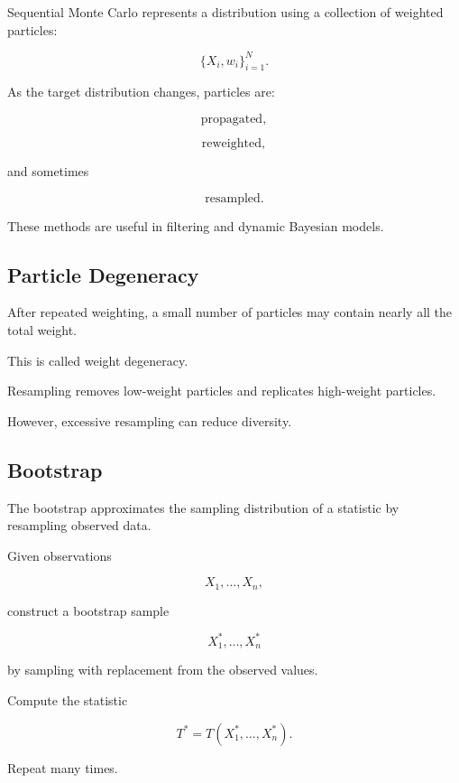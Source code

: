 Sequential Monte Carlo represents a distribution using a collection of
weighted particles:

\[
\boxed{
\{
X_i,w_i
\}_{i=1}^{N}.
}
\]

As the target distribution changes, particles are:

\[
\boxed{
\text{propagated},
}
\]

\[
\boxed{
\text{reweighted},
}
\]

and sometimes

\[
\boxed{
\text{resampled}.
}
\]

These methods are useful in filtering and dynamic Bayesian models.

\subsection{Particle Degeneracy}
\label{subsec:particle-degeneracy}

After repeated weighting, a small number of particles may contain nearly
all the total weight.

This is called weight degeneracy.

Resampling removes low-weight particles and replicates high-weight
particles.

However, excessive resampling can reduce diversity.

\subsection{Bootstrap}
\label{subsec:bootstrap-monte-carlo}

The bootstrap approximates the sampling distribution of a statistic by
resampling observed data.

Given observations

\[
X_1,\ldots,X_n,
\]

construct a bootstrap sample

\[
X_1^*,\ldots,X_n^*
\]

by sampling with replacement from the observed values.

Compute the statistic

\[
\boxed{
T^*
=
T(X_1^*,\ldots,X_n^*).
}
\]

Repeat many times.

